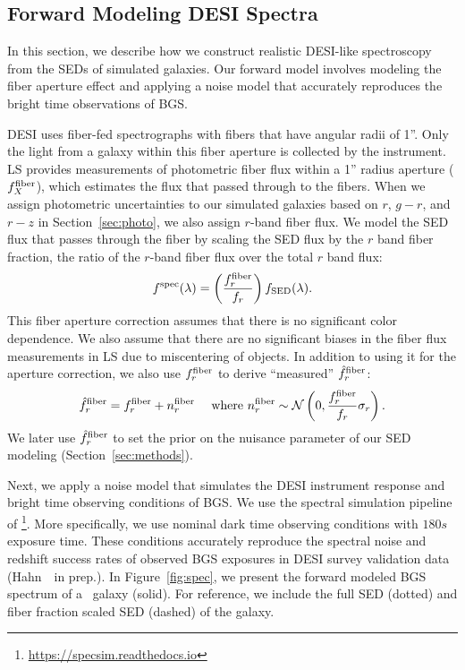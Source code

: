 \subsection{Forward Modeling DESI Spectra} \label{sec:spec}
In this section, we describe how we construct realistic DESI-like spectroscopy 
from the SEDs of simulated galaxies. 
Our forward model involves modeling the fiber aperture effect and applying a
noise model that accurately reproduces the bright time observations of BGS. 

DESI uses fiber-fed spectrographs with fibers that have angular radii of 1''. 
Only the light from a galaxy within this fiber aperture is collected by the 
instrument.
LS provides measurements of photometric fiber flux within a 1'' radius aperture
($f_X^{\rm fiber}$), which estimates the flux that passed through to the fibers.
When we assign photometric uncertainties to our simulated galaxies based on
$r$, $g-r$, and $r-z$ in Section~\ref{sec:photo}, we also assign $r$-band fiber
flux. 
We model the SED flux that passes through the fiber by scaling the SED flux by
the $r$ band fiber fraction, the ratio of the $r$-band fiber flux over the
total $r$ band flux: 
\begin{equation}
    f^{\rm spec}(\lambda) = \left(\frac{f_r^{\rm fiber}}{f_r}\right)f_{\rm SED}(\lambda).
\end{equation}
This fiber aperture correction assumes that there is no significant color
dependence. 
We also assume that there are no significant biases in the fiber flux
measurements in LS due to miscentering of objects. 
In addition to using it for the aperture correction, we also use $f_r^{\rm
fiber}$ to derive ``measured'' $\hat{f}_r^{\rm fiber}$: 
\begin{equation}
    \hat{f}_r^{\rm fiber} = f_r^{\rm fiber} + n^{\rm fiber}_r \quad~{\rm
    where}~n^{\rm fiber}_r \sim \mathcal{N}\left(0, \frac{f_r^{\rm fiber}}{f_r}
    \sigma_r\right).
\end{equation}
We later use $\hat{f}_r^{\rm fiber}$ to set the prior on the nuisance parameter
of our SED modeling (Section~\ref{sec:methods}).

Next, we apply a noise model that simulates the DESI instrument response and
bright time observing conditions of BGS. 
We use the spectral simulation pipeline of 
\footnote{\href{https://specsim.readthedocs.io/en/stable/guide.html}{https://specsim.readthedocs.io}}. 
More specifically, we use nominal dark time observing conditions with $180s$
exposure time. 
These conditions accurately reproduce the spectral noise and redshift success
rates of observed BGS exposures in DESI survey validation data (Hahn~\etal~in
prep.).
In Figure~\ref{fig:spec}, we present the forward modeled BGS spectrum of a
\lgal~galaxy (solid). 
For reference, we include the full SED (dotted) and fiber fraction scaled SED
(dashed) of the galaxy. 



